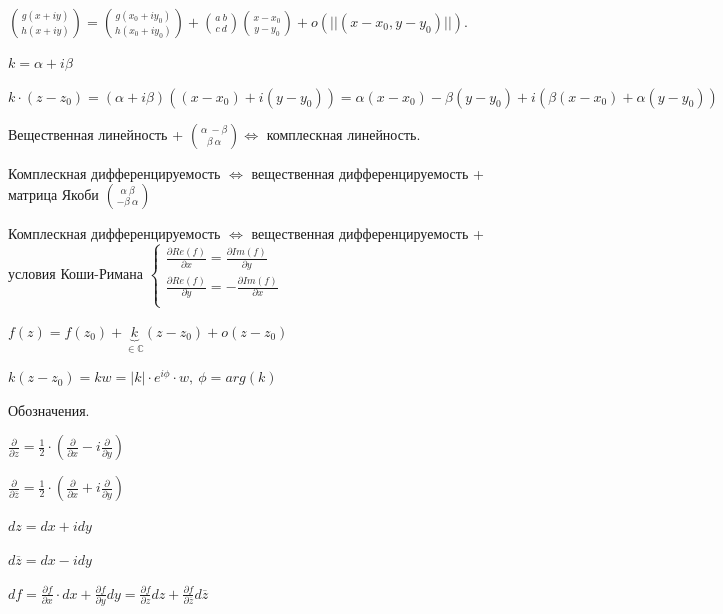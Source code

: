 \begin{remark}
    $\binom{g(x + iy)}{h(x + iy)} = \binom{g(x_0 + i y_0)}{h(x_0 + iy_0)} + \binom{a \ b}{c \ d} \binom{x - x_0}{y - y_0} + o(|| (x - x_0, y - y_0) ||)$.

    $k = \alpha + i \beta$

    $k \cdot (z - z_0) = (\alpha + i \beta) ( (x - x_0) + i (y - y_0)) = \alpha(x - x_0) - \beta(y - y_0) + i (\beta (x - x_0) + \alpha (y - y_0))$

    Вещественная линейность + $\binom{\alpha \ -\beta}{\beta \ \alpha} \Leftrightarrow$ комплескная линейность.
\end{remark}



\begin{remark}
    Комплескная дифференцируемость $\Leftrightarrow$ вещественная дифференцируемость + матрица Якоби $\binom{\alpha \ \beta}{-\beta \ \alpha}$


    Комплескная дифференцируемость $\Leftrightarrow$ вещественная дифференцируемость + условия Коши-Римана $
    \begin{cases}
        \frac{\partial Re(f)}{\partial x} = \frac{\partial Im (f)}{\partial y} \\
        \frac{\partial Re(f)}{\partial y} = -\frac{\partial Im (f)}{\partial x} \\
    \end{cases}
    $
\end{remark}
\begin{remark}
    $f(z) = f(z_0) + \underbrace{k}_{\in \mathbb{C}} (z - z_0) + o(z - z_0)$

    $k (z - z_0) = k w = |k| \cdot e^{i \phi} \cdot w, \ \phi = arg(k)$
\end{remark}


\begin{remark}
    Обозначения.

    $\frac{\partial}{\partial z} = \frac{1}{2} \cdot \left( \frac{\partial}{\partial x} - i \frac{\partial}{\partial y} \right)$

    $\frac{\partial}{\partial \overline{z}} = \frac{1}{2} \cdot \left( \frac{\partial}{\partial x} + i \frac{\partial}{\partial y} \right)$

    $dz = dx + i dy$

    $d \overline{z} = dx - i dy$

    $df = \frac{\partial f}{\partial x} \cdot dx + \frac{\partial f}{\partial y} dy = \frac{\partial f}{\partial z} dz + \frac{\partial f}{\partial \overline{z}} d \overline{z}$
\end{remark}

